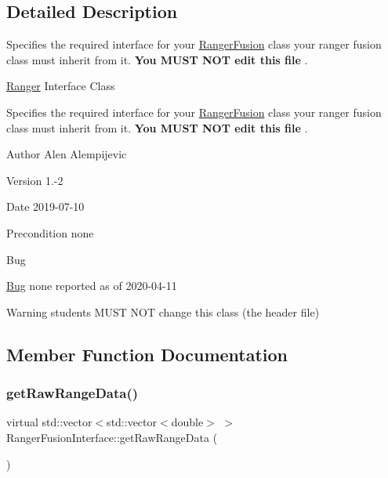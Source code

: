 \subsection{Detailed Description}
Specifies the required interface for your \hyperlink{classRangerFusion}{Ranger\+Fusion} class your ranger fusion class must inherit from it. {\bfseries  You M\+U\+ST N\+OT edit this file }. 

\hyperlink{classRanger}{Ranger} Interface Class

Specifies the required interface for your \hyperlink{classRangerFusion}{Ranger\+Fusion} class your ranger fusion class must inherit from it. {\bfseries  You M\+U\+ST N\+OT edit this file }. \begin{DoxyAuthor}{Author}
Alen Alempijevic 
\end{DoxyAuthor}
\begin{DoxyVersion}{Version}
1.-\/2 
\end{DoxyVersion}
\begin{DoxyDate}{Date}
2019-\/07-\/10 
\end{DoxyDate}
\begin{DoxyPrecond}{Precondition}
none 
\end{DoxyPrecond}
\begin{DoxyRefDesc}{Bug}
\item[\hyperlink{bug__bug000008}{Bug}]none reported as of 2020-\/04-\/11 \end{DoxyRefDesc}
\begin{DoxyWarning}{Warning}
students M\+U\+ST N\+OT change this class (the header file) 
\end{DoxyWarning}


\subsection{Member Function Documentation}
\mbox{\label{classRangerFusionInterface_a9d60ca5866261026b870d7c0171587f5}} 
\subsubsection{\texorpdfstring{get\+Raw\+Range\+Data()}{getRawRangeData()}}
{\footnotesize\ttfamily virtual std\+::vector$<$std\+::vector$<$double$>$ $>$ Ranger\+Fusion\+Interface\+::get\+Raw\+Range\+Data (\begin{DoxyParamCaption}{ }\end{DoxyParamCaption})\hspace{0.3cm}{\ttfamily [pure virtual]}}



